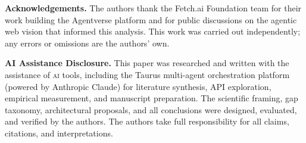 \documentclass[twoside,11pt]{article}
\begin{document}
\vspace{1em}
\noindent\textbf{Acknowledgements.}
The authors thank the Fetch.ai Foundation team for their work building the
Agentverse platform and for public discussions on the agentic web vision that
informed this analysis.  This work was carried out independently; any errors
or omissions are the authors' own.

\medskip
\noindent\textbf{AI Assistance Disclosure.}
This paper was researched and written with the assistance of
\textsc{ai} tools, including the Taurus multi-agent orchestration platform
(powered by Anthropic Claude) for literature synthesis, API exploration,
empirical measurement, and manuscript preparation.  The scientific framing,
gap taxonomy, architectural proposals, and all conclusions were designed,
evaluated, and verified by the authors.  The authors take full responsibility
for all claims, citations, and interpretations.



\end{document}
